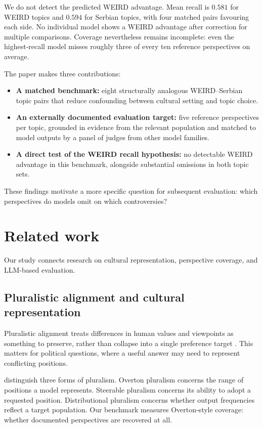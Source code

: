 \documentclass[11pt,a4paper]{article}
\begin{document}
We do not detect the predicted WEIRD advantage. Mean recall is $0.581$ for WEIRD topics and $0.594$ for Serbian topics, with four matched pairs favouring each side. No individual model shows a WEIRD advantage after correction for multiple comparisons. Coverage nevertheless remains incomplete: even the highest-recall model misses roughly three of every ten reference perspectives on average.

The paper makes three contributions:
\begin{itemize}
\item \textbf{A matched benchmark:} eight structurally analogous WEIRD--Serbian topic pairs that reduce confounding between cultural setting and topic choice.
\item \textbf{An externally documented evaluation target:} five reference perspectives per topic, grounded in evidence from the relevant population and matched to model outputs by a panel of judges from other model families.
\item \textbf{A direct test of the WEIRD recall hypothesis:} no detectable WEIRD advantage in this benchmark, alongside substantial omissions in both topic sets.
\end{itemize}

These findings motivate a more specific question for subsequent evaluation: which perspectives do models omit on which controversies?

\section{Related work}
\label{sec:Related work}
Our study connects research on cultural representation, perspective coverage, and LLM-based evaluation.

\subsection{Pluralistic alignment and cultural representation}
\label{sec:Pluralistic alignment and cultural representation}
Pluralistic alignment treats differences in human values and viewpoints as something to preserve, rather than collapse into a single preference target \cite{sorensenRoadmapPluralisticAlignment2024, fengModularPluralismPluralistic2024, aliOperationalizingPluralisticValues2025}. This matters for political questions, where a useful answer may need to represent conflicting positions.

\citet{sorensenRoadmapPluralisticAlignment2024} distinguish three forms of pluralism. Overton pluralism concerns the range of positions a model represents. Steerable pluralism concerns its ability to adopt a requested position. Distributional pluralism concerns whether output frequencies reflect a target population. Our benchmark measures Overton-style coverage: whether documented perspectives are recovered at all.
\end{document}
